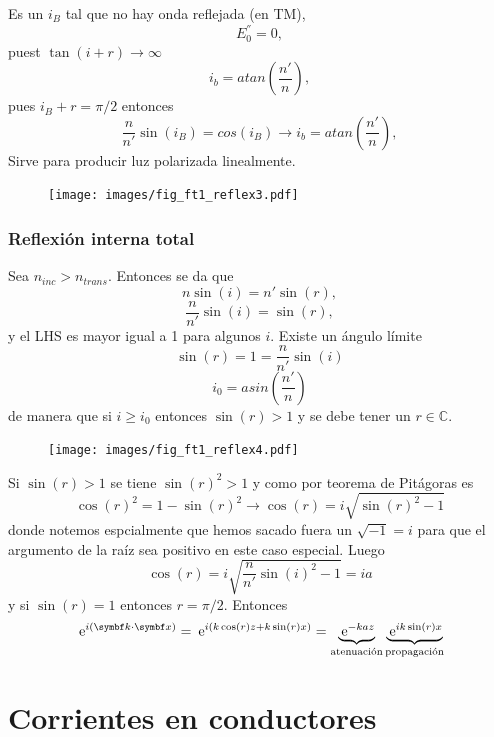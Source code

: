 \documentclass[10pt,oneside]{CBFT_book}
\begin{document}
Es un $i_B$ tal que no hay onda  reflejada (en TM),
\[
	E_0^{''} = 0,
\]
puest $\tan( i + r) \to \infty$
\[
	i_b = atan \left( \frac{n'}{n}\right) ,
\]
pues $ i_B + r = \pi/2$ entonces 
\[
	\frac{n}{n'}\sin(i_B) = cos(i_B) \rightarrow i_b = atan \left( \frac{n'}{n}\right),
\]
Sirve para producir luz polarizada linealmente.

\begin{figure}[htb]
	\begin{center}
	\texttt{[image: images/fig\_ft1\_reflex3.pdf]}	 
	\end{center}
	\caption{}
\end{figure} 


\subsubsection{Reflexión interna total}

Sea $ n_{inc} > n_{trans} $. Entonces se da que
\[
	n \sin(i) = n'\sin(r),
\]
\[
	\frac{n}{n'} \sin(i) = \sin(r),
\]
y el LHS es mayor igual a 1 para algunos $i$. Existe un ángulo límite 
\[
	\sin(r) = 1 = \frac{n}{n'} \sin(i) 
\]
\[
	i_0 = asin\left( \frac{n'}{n} \right)
\]
de manera que si $i \geq i_0$ entonces $\sin(r) > 1$ y se debe tener un $r\in \mathbb{C}$.

\begin{figure}[htb]
	\begin{center}
	\texttt{[image: images/fig\_ft1\_reflex4.pdf]}	 
	\end{center}
	\caption{}
\end{figure} 

Si $\sin(r)>1$ se tiene $\sin(r)^2 > 1$ y como por teorema de Pitágoras es 
\[
	\cos(r)^2 = 1 - \sin(r)^2 \rightarrow \cos(r) = i \sqrt{ \sin(r)^2 - 1 }
\]
donde notemos espcialmente que hemos sacado fuera un $\sqrt{-1} = i$ para que el argumento de la raíz sea positivo en 
este caso especial. Luego 
\[
	\cos(r) = i \sqrt{ \frac{n}{n'}\sin(i)^2 - 1 } = i a 
\]
y si $\sin(r) = 1$ entonces $r = \pi/2$.
Entonces
\[
	\euler^{i(\vb{k}\cdot\vb{x})} = \euler^{i(k \cos(r)z + k \sin(r)x)} =
		\underbrace{\euler^{-kaz}}_{\text{atenuación}} 
		\underbrace{\euler^{ik\sin(r)x}}_{\text{propagación}}
\]


\section{Corrientes en conductores}
\end{document}
